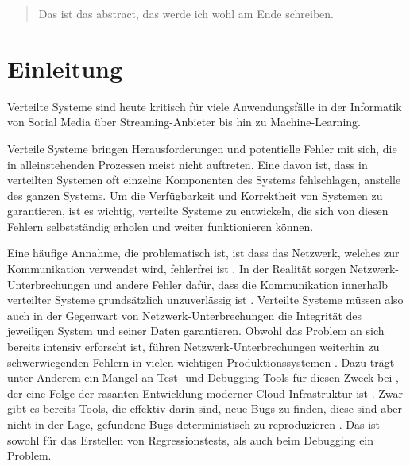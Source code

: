 \documentclass[12pt,a4paper]{report}
\begin{document}
\begin{abstract}
	Das ist das abstract, das werde ich wohl am Ende schreiben.
\end{abstract}


\chapter{Einleitung}
Verteilte Systeme sind heute kritisch für viele Anwendungsfälle in der Informatik von Social Media über Streaming-Anbieter bis hin
zu Machine-Learning.

Verteile Systeme bringen Herausforderungen und potentielle Fehler mit sich, die in alleinstehenden Prozessen meist nicht
auftreten. Eine davon ist, dass in verteilten Systemen oft einzelne Komponenten des Systems fehlschlagen, anstelle des ganzen
Systems. Um die Verfügbarkeit und Korrektheit von Systemen zu garantieren, ist es wichtig, verteilte Systeme zu entwickeln, die
sich von diesen Fehlern selbstständig erholen und weiter funktionieren können. \cite{distributed_systems_book}

Eine häufige Annahme, die problematisch ist, ist dass das Netzwerk, welches zur Kommunikation verwendet wird,
fehlerfrei ist \cite{brief_introduction_to_distributed_systems, the_network_is_reliable}. In der Realität sorgen
Netzwerk-Unterbrechungen und andere Fehler dafür, dass die Kommunikation innerhalb verteilter Systeme grundsätzlich unzuverlässig
ist \cite{distributed_systems_book, distributed_systems_concepts_and_design}. Verteilte Systeme müssen also auch in der Gegenwart
von Netzwerk-Unterbrechungen die Integrität des jeweiligen System und seiner Daten garantieren. Obwohl das Problem an sich bereits
intensiv erforscht ist, führen Netzwerk-Unterbrechungen weiterhin zu schwerwiegenden Fehlern in vielen wichtigen
Produktionssystemen \cite{analysis_of_network_partition_failures}. Dazu trägt unter Anderem ein Mangel an Test- und
Debugging-Tools für diesen Zweck bei \cite{failify_paper,simple_testing_can_prevent}, der eine Folge der rasanten Entwicklung
moderner Cloud-Infrastruktur ist \cite{why_does_cloud_stop_computing}. Zwar gibt es bereits Tools, die effektiv darin sind, neue
Bugs zu finden, diese sind aber nicht in der Lage, gefundene Bugs deterministisch zu reproduzieren \cite{failify_paper}. Das ist
sowohl für das Erstellen von Regressionstests, als auch beim Debugging ein Problem.
\end{document}
